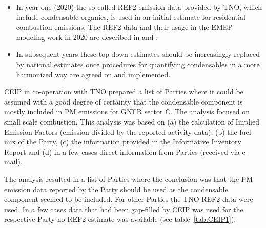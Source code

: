 \begin{itemize}
\item In year one (2020) the so-called REF2 emission data provided by TNO, which include condensable organics,  is used in an initial estimate for residential combustion emissions. The REF2 data and their usage in the EMEP modeling work in 2020 are described  in  \citet{R2020:CAMSREF2} and \citet{R2020:SVOC}. 
\item  In subsequent years these top-down estimates should be increasingly replaced by national estimates once procedures for quantifying condensables in a more harmonized way are agreed on and implemented.
\end{itemize}

CEIP in co-operation with TNO prepared a list of Parties where it could be assumed with a good degree of certainty that the condensable component is mostly included in PM emissions for GNFR sector C. The analysis focused on small scale combustion. This analysis was based on (a) the calculation of Implied Emission Factors (emission divided by the reported activity data), (b) the fuel mix of the Party, (c) the information provided in the Informative Inventory Report and (d) in a few cases direct information from Parties (received via e-mail).

The analysis resulted in a list of Parties where the conclusion was that the PM emission data reported by the Party should be used as the condensable component seemed to be included. For other Parties the TNO REF2 data were used. In a few cases data that had been gap-filled by CEIP was used for the respective Party no REF2 estimate was available (see table~\ref{tab:CEIP1}).



